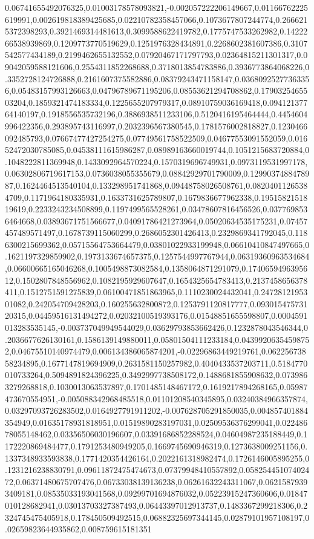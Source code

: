 0.06741655492076325,0.01003178578093821,-0.002057222206149667,0.01166762225619991,0.002619818389425685,0.02210782358457066,0.1073677807244774,0.2666215372398293,0.3921469314481613,0.3099588622419782,0.1775747533262982,0.1422266538939869,0.1209773770519629,0.1251976328434891,0.2268602381607386,0.3107542577434189,0.2199462655132552,0.07920467171797793,0.02364815211301317,0.09042059588121606,0.2554311852268688,0.3718013854783886,0.3936773864068226,0.3352728124726888,0.2161607375582886,0.08379243471158147,0.03680925277363356,0.05483157993126663,0.04796789671195206,0.08553621294708862,0.1790325465503204,0.1859321474183334,0.1225655207979317,0.08910759036169418,0.09412137764140197,0.1918556535732196,0.3886938511233106,0.5120416195464444,0.4454604996422356,0.293895743116997,0.2032396567380545,0.1781576002818827,0.1230466092485793,0.07667477427254275,0.07749561758522509,0.04677553091552059,0.01652472030785085,0.04538111615986287,0.08989163660019744,0.1051215683720884,0.1048222811369948,0.1433092964570224,0.1570319696749931,0.0973119531997178,0.06302806719617153,0.0736038055355679,0.08842929701790009,0.1299037488478987,0.1624464513540104,0.133298951741868,0.09448758026508761,0.08204011265384709,0.1171964180335931,0.1633731625789807,0.1679836677962338,0.1951582151819619,0.2233243234508899,0.1197499565528261,0.03478607816456526,0.0377698536464668,0.03893671751566677,0.04091786421273964,0.05020634535175231,0.07457457489571497,0.1678739115060299,0.2686052301426413,0.2329869341792045,0.1186300215699362,0.05715564753664479,0.03801022933199948,0.06610410847497665,0.1621197329859902,0.1973133674657375,0.1257544997767944,0.06319360963534684,0.06600665165046268,0.1005498873082584,0.1358064871291079,0.1740659496395612,0.1502807848556962,0.1082195929607647,0.1654325654783413,0.2137458656378411,0.1512751591275839,0.06100471851863965,0.1110230024432041,0.2472812195301082,0.242054709428203,0.160255632800872,0.1253791120817777,0.09301547573120315,0.04459516131494272,0.02032100519393176,0.01548851655598807,0.0004591013283535145,-0.003737049949544029,0.03629793853662426,0.1232878043546344,0.2036677626130161,0.1586139149880011,0.05801504111233184,0.04399206354598752,0.04675510140974479,0.006134386065874201,-0.02296863449219761,0.06225673858234895,0.1677147819694909,0.2631581150257982,0.4040433537203711,0.5184770010733264,0.5094891824396225,0.3492997738508172,0.1488681855908632,0.0739863279268818,0.1030013063537897,0.1701485148467172,0.1619217894268165,0.05987473670554951,-0.005088342968485518,0.01101208540345895,0.03240384966357874,0.03297093726283502,0.0164927791911202,-0.007628705291850035,0.004857401884354949,0.01635178931818951,0.01519890283197031,0.02509536376299041,0.02248678055148462,0.03356506030196607,0.03391686852288524,0.04604987235188449,0.1172220869484477,0.1791253480949205,0.1669745690946319,0.1273638009251156,0.1337348933593838,0.1771420354426164,0.2022161318982474,0.1726146005895255,0.1231216238830791,0.09611872475474673,0.07379948410557892,0.05825445107402472,0.06371480675707476,0.06733038139136238,0.06261632243311067,0.06215879393409181,0.08535033193041568,0.09299701694876032,0.05223915247360606,0.01847010128682941,0.03013703327387493,0.06443397012913737,0.1483367299218306,0.2324745475405918,0.178450509492515,0.06882325697344145,0.02879101957108197,0.02659823644935862,0.008759615181351